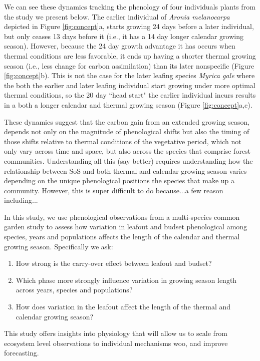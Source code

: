 \documentclass[12 pt]{article}
\begin{document}
We can see these dynamics tracking the phenology of four individuals plants from the study we present below. The earlier individual of \emph{Aronia melanocarpa} depicted in Figure \ref{fig:concept}a, starts growing 24 days before a later individual, but only ceases 13 days before it (i.e., it has a 14 day longer calendar growing season). However, because the 24 day growth advantage it has occurs when thermal conditions are less favorable, it ends up having a shorter thermal growing season (i.e., less change for carbon assimilation) than its later nonspecific (Figure \ref{fig:concept}b). This is not the case for the later leafing species \emph{Myrica gale} where the both the earlier and later leafing individual start growing under more optimal thermal conditions, so the 20 day ``head start" the earlier individual incurs results in a both a longer calendar and thermal growing season (Figure \ref{fig:concept}a,c). 

These dynamics suggest that the carbon gain from an extended growing season, depends not only on the magnitude of phenological shifts but also the timing of those shifts relative to thermal conditions of the vegetative period, which not only vary across time and space, but also across the species that comprise forest communities. Understanding all this (say better) requires  understanding how the relationship between SoS and both thermal and calendar growing season varies depending on the unique phenological positions the species that make up a community. However, this is super difficult to do because...a few reason including...  

In this study, we use phenological observations from a multi-species common garden study to 
assess how variation in leafout and  budset phenological among species, years and populations affects the length of the calendar and thermal growing season. Specifically we ask:

\begin{enumerate}
\item How strong is the carry-over effect between leafout and budset? 
\item Which phase more strongly influence variation in growing season length across years, species and populations?
\item How does variation in the leafout affect the length of the thermal and calendar growing season?
\end{enumerate}

This study offers insights into physiology that will allow us to scale from ecosystem level observations to individual mechanisms woo, and improve forecasting.
\end{document}

